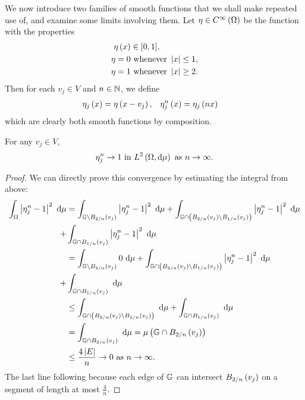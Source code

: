 We now introduce two families of smooth functions that we shall make repeated use of, and examine some limits involving them.
Let $\eta\in C^{\infty}\left( \Omega \right)$ be the function with the properties
\begin{align*}
	\eta\left( x \right) &\in [0,1], \\
	\eta = 0 &\text{ whenever } \left\lvert x \right\rvert\leq 1, \\
	\eta = 1 &\text{ whenever } \left\lvert x \right\rvert\geq 2.
\end{align*}
Then for each $v_j\in V$ and $n\in\mathbb{N}$, we define
\begin{align} \label{eq:etaDef}
	\eta_j\left( x \right) = \eta\left( x-v_j \right), &\quad \eta_j^n\left( x \right) = \eta_j\left( nx \right)
\end{align}
which are clearly both smooth functions by composition.

\begin{lemma} \label{lem:etaConv}
	For any $v_j\in V$, 
	\begin{align*}
		\eta_j^n \rightarrow 1 \text{ in } L^{2}\left( \Omega,\mathrm{d}\mu \right) \ \text{as} \ n \rightarrow\infty.
	\end{align*}
\end{lemma}
\begin{proof}
	We can directly prove this convergence by estimating the integral from above:
	\begin{align*}
		\begin{split}
			\int_{\Omega}\left\lvert \eta_j^n-1 \right\rvert^2 \ \mathrm{d}\mu &= \int_{\mathbb{G}\setminus B_{2/n}\left( v_j \right)}\left\lvert \eta_j^n-1 \right\rvert^2 \ \mathrm{d}\mu + \int_{\mathbb{G} \cap \left( B_{2/n}\left( v_j \right) \setminus B_{1/n}\left( v_j \right) \right)}\left\lvert \eta_j^n-1 \right\rvert^2 \ \mathrm{d}\mu \\ + &\int_{\mathbb{G}\cap B_{1/n}\left( v_j \right)}\left\lvert \eta_j^n-1 \right\rvert^2 \ \mathrm{d}\mu \\
			&= \int_{\mathbb{G}\setminus B_{2/n}\left( v_j \right)}0 \ \mathrm{d}\mu + \int_{\mathbb{G} \cap \left( B_{2/n}\left( v_j \right) \setminus B_{1/n}\left( v_j \right) \right)}\left\lvert \eta_j^n-1 \right\rvert^2 \ \mathrm{d}\mu \\ + &\int_{\mathbb{G}\cap B_{1/n}\left( v_j \right)} \ \mathrm{d}\mu \\
			&\leq \int_{\mathbb{G} \cap \left( B_{2/n}\left( v_j \right) \setminus B_{1/n}\left( v_j \right) \right)} \ \mathrm{d}\mu + \int_{\mathbb{G}\cap B_{1/n}\left( v_j \right)} \ \mathrm{d}\mu \\
			&=\int_{\mathbb{G}\cap B_{2/n}\left( v_j \right)} \ \mathrm{d}\mu = \mu\left( \mathbb{G}\cap B_{2/n}\left( v_j \right) \right) \\
			&\leq \frac{4 \left\lvert E \right\rvert}{n} \rightarrow0 \ \text{as} \ n \rightarrow\infty.
		\end{split}
	\end{align*}
	The last line following because each edge of $\mathbb{G}$ can intersect $B_{2/n}\left( v_j \right)$ on a segment of length at most $\frac{4}{n}$.
\end{proof}

